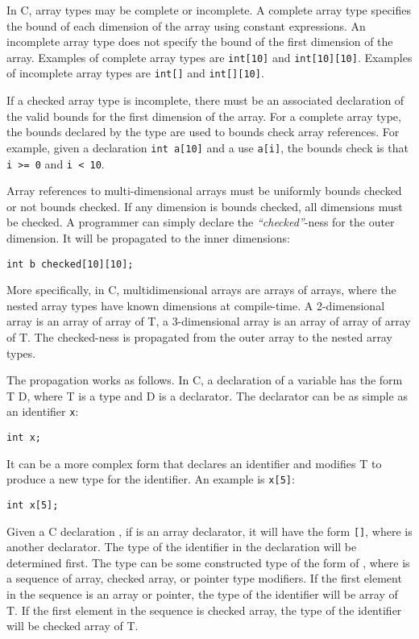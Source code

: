 In C, array types may be complete or incomplete. A complete array type
specifies the bound of each dimension of the array using constant
expressions. An incomplete array type does not specify the bound of the
first dimension of the array. Examples of complete array types are
\texttt{int[10]} and \texttt{int[10][10]}. Examples of
incomplete array types are \texttt{int[]} and \texttt{int[][10]}.

If a checked array type is incomplete, there must be an associated
declaration of the valid bounds for the first dimension of the array.
For a complete array type, the bounds declared by the type are used to
bounds check array references. For example, given a declaration
\texttt{int a[10]} and a use \texttt{a[i]}, the bounds check is
that \texttt{i >= 0} and \texttt{i < 10}.

Array references to multi-dimensional arrays must be uniformly bounds
checked or not bounds checked. If any dimension is bounds checked, all
dimensions must be checked. A programmer can simply declare the
\emph{``checked''}-ness for the outer dimension. It will be propagated
to the inner dimensions:

\begin{verbatim}
int b checked[10][10];
\end{verbatim}

More specifically, in C, multidimensional arrays are arrays of arrays,
where the nested array types have known dimensions at compile-time. A
2-dimensional array is an array of array of T, a 3-dimensional array is
an array of array of array of T. The checked-ness is propagated from the
outer array to the nested array types.

The propagation works as follows. In C, a declaration of a variable has
the form T D, where T is a type and D is a declarator. The declarator
can be as simple as an identifier \texttt{x}:
\begin{verbatim}
int x;
\end{verbatim}

It can be a more complex form that declares an identifier and modifies T
to produce a new type for the identifier. An example is \texttt{x[5]}:

\begin{verbatim}
int x[5];
\end{verbatim}

Given a C declaration  , if  is an array
declarator, it will have the form
\texttt{[]},
where  is another declarator. The type of the identifier in the
declaration  will be determined first. The type can be some
constructed type of the form  of , where
 is a sequence of array, checked array, or pointer
type modifiers. If the first element in the 
sequence is an array or pointer, the type of the identifier will be
 array of T. If the first element in the
 sequence is checked array, the type of the
identifier will be  checked array of T.

